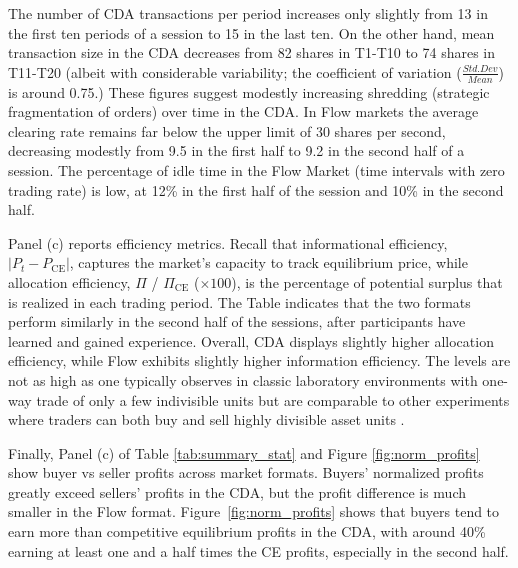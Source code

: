 \documentclass[12pt]{article}
\begin{document}
The number of CDA transactions per period increases only slightly from 13 in the first ten periods of a session to 15 in the last ten. On the other hand, mean transaction size in the CDA  decreases from 82 shares in T1-T10 to 74 shares in T11-T20 (albeit with considerable variability; the coefficient of variation ($\frac{Std. Dev}{Mean}$) is around 0.75.) 
These figures suggest modestly increasing shredding (strategic fragmentation of orders)
over time in the CDA.
In Flow markets the average clearing rate remains far below the upper limit of 30 shares per second, decreasing modestly from 9.5 in the first half to 9.2 in the second half of a session. 
The percentage of idle time in the Flow Market (time intervals with zero trading rate) is low, at 12\% in the first half of the session and 10\% in the second half. 

Panel (c) reports efficiency metrics. Recall that informational efficiency, $\lvert P_t - P_{\text{CE}} \rvert $, captures the market's capacity to track equilibrium price, while allocation efficiency,  $\Pi$ / $\Pi_{\text{CE}}$ ($\times 100$), is the percentage of potential surplus that is realized in each trading period. The Table indicates that the two formats perform similarly in the second half of the sessions, after participants have learned and gained experience. 
Overall, CDA displays slightly higher allocation efficiency, while Flow exhibits slightly higher information efficiency. The levels are not as high as one typically observes in classic laboratory environments with one-way trade of only a few indivisible units but are comparable to other experiments where traders can both buy and sell highly divisible asset units \citep{angereretal}.

Finally, Panel (c) of Table \ref{tab:summary_stat} and Figure \ref{fig:norm_profits} show buyer vs seller  profits across market formats. Buyers' normalized profits greatly exceed sellers' profits in the CDA, but the profit difference is much smaller in the Flow format. 
Figure~\ref{fig:norm_profits} shows that buyers tend to earn more than competitive equilibrium profits in the CDA, with around 40\% earning at least one and a half times the CE profits, especially in the second half. 
\end{document}
